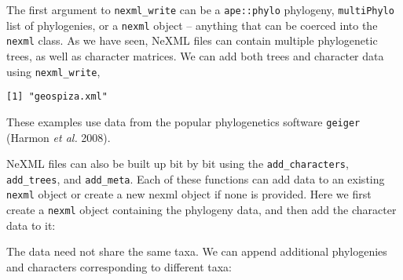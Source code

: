 \documentclass[author-year, review, 11pt]{components/elsarticle} %
\newenvironment{Shaded}{\begin{snugshade}}{\end{snugshade}}
\newcommand{\KeywordTok}[1]{\textcolor[rgb]{0.13,0.29,0.53}{\textbf{{#1}}}}
\newcommand{\DataTypeTok}[1]{\textcolor[rgb]{0.13,0.29,0.53}{{#1}}}
\newcommand{\StringTok}[1]{\textcolor[rgb]{0.31,0.60,0.02}{{#1}}}
\newcommand{\NormalTok}[1]{{#1}}
\begin{document}
The first argument to \texttt{nexml\_write} can be a \texttt{ape::phylo}
phylogeny, \texttt{multiPhylo} list of phylogenies, or a \texttt{nexml}
object -- anything that can be coerced into the \texttt{nexml} class. As
we have seen, NeXML files can contain multiple phylogenetic trees, as
well as character matrices. We can add both trees and character data
using \texttt{nexml\_write},

\begin{Shaded}
\end{Shaded}

\begin{verbatim}
[1] "geospiza.xml"
\end{verbatim}

These examples use data from the popular phylogenetics software
\texttt{geiger} (Harmon \emph{et al.} 2008).

NeXML files can also be built up bit by bit using the
\texttt{add\_characters}, \texttt{add\_trees}, and \texttt{add\_meta}.
Each of these functions can add data to an existing \texttt{nexml}
object or create a new nexml object if none is provided. Here we first
create a \texttt{nexml} object containing the phylogeny data, and then
add the character data to it:

\begin{Shaded}
\end{Shaded}

The data need not share the same taxa. We can append additional
phylogenies and characters corresponding to different taxa:

\begin{Shaded}
\end{Shaded}
\end{document}
